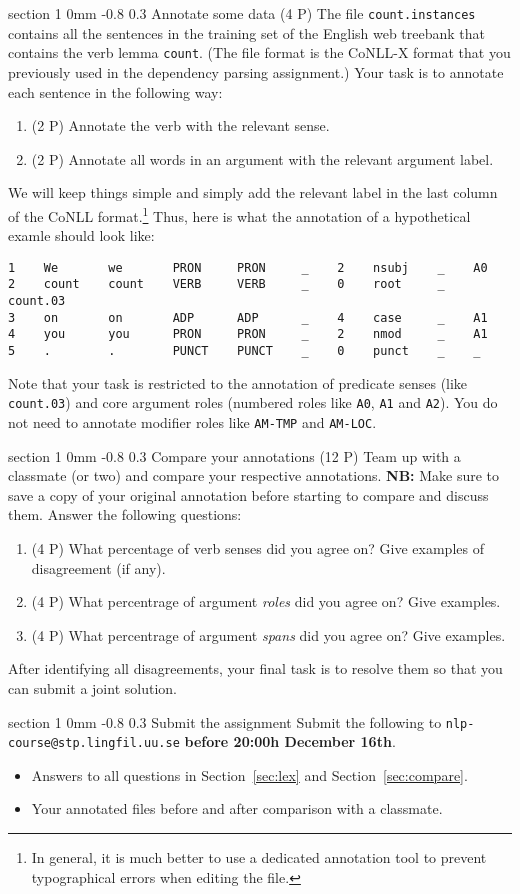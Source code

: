 \documentclass[11pt]{article}
\makeatletter
\newcommand{\newsec}[2]{\section{#1}\label{sec:#2}\noindent}
\renewcommand{\section}{\@startsection
{section}%
{1}%
{0mm}%
{-0.8\baselineskip}%
{0.3\baselineskip}%
{\bfseries\large}}%
\makeatother
\begin{document}
\newsec{Annotate some data (4 P)}{annotate}%
The file {\tt count.instances} contains all the sentences in the
training set of the English web treebank that contains the verb lemma
{\tt count}. (The file format is the CoNLL-X format that you
previously used in the dependency parsing assignment.) Your task is to
annotate each sentence in the following way:
\begin{enumerate}[noitemsep,topsep=0.2cm]
\item (2 P) Annotate the verb with the relevant sense.
\item (2 P) Annotate all words in an argument with the relevant argument label.
\end{enumerate}
We will keep things simple and simply add the relevant label in the
last column of the CoNLL format.\footnote{In general, it is much
  better to use a dedicated annotation tool to prevent typographical
  errors when editing the file.}  Thus, here is what the annotation of
a hypothetical examle should look like:
\begin{Verbatim}[fontsize=\small,xleftmargin=\parindent]
1    We       we       PRON     PRON     _    2    nsubj    _    A0
2    count    count    VERB     VERB     _    0    root     _    count.03
3    on       on       ADP      ADP      _    4    case     _    A1
4    you      you      PRON     PRON     _    2    nmod     _    A1
5    .        .        PUNCT    PUNCT    _    0    punct    _    _
\end{Verbatim}
Note that your task is restricted to the annotation of predicate
senses (like {\tt count.03}) and core argument roles (numbered roles
like {\tt A0}, {\tt A1} and {\tt A2}). You do not need to annotate
modifier roles like {\tt AM-TMP} and {\tt AM-LOC}.

\newsec{Compare your annotations (12 P)}{compare}%
Team up with a classmate (or two) and compare your respective
annotations. {\bf NB:} Make sure to save a copy of your original
annotation before starting to compare and discuss them.  Answer the
following questions:
\begin{enumerate}[noitemsep,topsep=0.2cm]
\item (4 P) What percentage of verb senses did you agree on? Give
  examples of disagreement (if any).
\item (4 P) What percentrage of argument {\em roles} did you agree on?
  Give examples.
\item (4 P) What percentrage of argument {\em spans} did you agree on?
  Give examples.
\end{enumerate}
After identifying all disagreements, your final task is to resolve
them so that you can submit a joint solution.

\newsec{Submit the assignment}{submit}%
Submit the following to {\tt nlp-course@stp.lingfil.uu.se}
\textbf{before 20:00h December 16th}.
\begin{itemize}[noitemsep,topsep=0.2cm]
\item Answers to all questions in Section~\ref{sec:lex} and
  Section~\ref{sec:compare}.
\item Your annotated files before and after comparison with a
  classmate.
\end{itemize}
\end{document}
